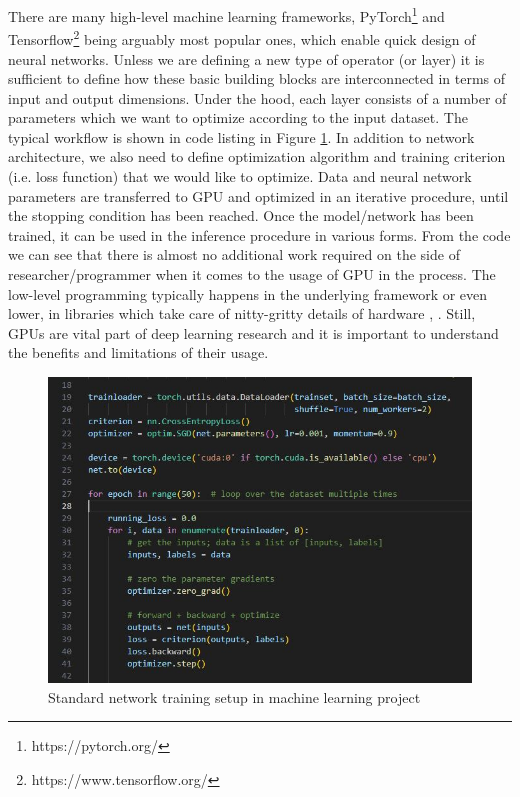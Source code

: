 \documentclass{article}
\begin{document}
There are many high-level machine learning frameworks, PyTorch\footnote{https://pytorch.org/} and Tensorflow\footnote{https://www.tensorflow.org/} being arguably most popular ones, which enable quick design of neural networks. Unless we are defining a new type of operator (or layer)
it is sufficient to define how these basic building blocks are interconnected in terms of input and output dimensions. 
Under the hood, each layer consists of a number of parameters which we want to optimize according to the input dataset. The typical workflow is shown in code listing in Figure \ref{fig:neural_training}.
In addition to network architecture, we also need to define optimization algorithm and training criterion (i.e. loss function) that we would like to optimize. 
Data and neural network parameters are transferred to GPU and optimized in an iterative procedure, until the stopping condition has been reached.
Once the model/network has been trained, it can be used in the inference procedure in various forms.
From the code we can see that there is almost no additional work required on the side of researcher/programmer when it comes to the usage of GPU in the process.
The low-level programming typically happens in the underlying framework or even lower, in libraries which take care of nitty-gritty details of hardware \cite{Chetlur2014}, \cite{Blackford2002}.
Still, GPUs are vital part of deep learning research and it is important to understand the benefits and limitations of their usage. 

\begin{figure}[t!]
    \centering
    \includegraphics[width=12cm]{train.JPG}
    \caption{Standard network training setup in machine learning project}
    \label{fig:neural_training}
\end{figure}
\end{document}
